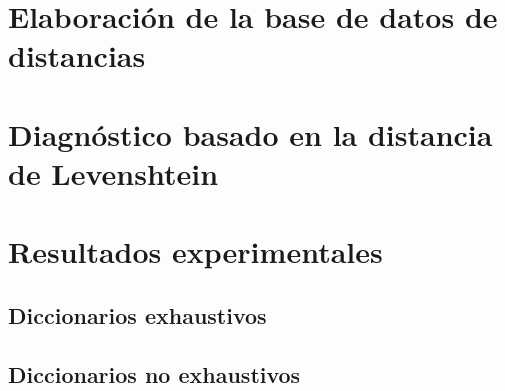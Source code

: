 
\section{Elaboración de la base de datos de distancias}
\label{sec:LevenDist}

\section{Diagnóstico basado en la distancia de Levenshtein}
\label{sec:LevenCands}



\section{Resultados experimentales}
\label{sec:LevenResults}


\subsection{Diccionarios exhaustivos}
\label{subsec:LevDicExhaust}


\subsection{Diccionarios no exhaustivos}
\label{subsec:LevDicNoExhaust}


\endinput

